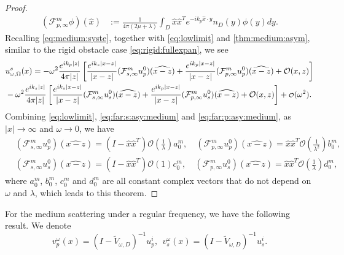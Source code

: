 \documentclass[a4paper,11pt]{article}
\newcommand{\mO}{\mathcal{O}}
\newcommand\smallO{
  \mathchoice
    {{\scriptstyle\mathcal{O}}}%
    {{\scriptstyle\mathcal{O}}}%
    {{\scriptscriptstyle\mathcal{O}}}%
    {\scalebox{.7}{$\scriptscriptstyle\mathcal{O}$}}%
  }
\theoremstyle{remark}
\theoremstyle{definition}
\numberwithin{equation}{section}
\begin{document}
\begin{proof}
\begin{align}
(\mathcal{F}^{m}_{p,\infty}\phi)(\hat{x})& := \frac{1}{4\pi (2\mu + \lambda)}\int_{D} \hat{x}\hat{x}^{T}e^{-ik_p\hat{x}\cdot y}n_{D}(y) \phi(y) dy.  \label{eq:far:p:asy:medium}
\end{align}
Recalling \eqref{eq:medium:syste}, together with \eqref{eq:lowlimit} and \eqref{thm:medium:asym}, similar to the rigid obstacle case \eqref{eq:rigid:fullexpan}, we see
\begin{align}
 &u_{\omega,\Omega}^s(x)  = -\omega^2\frac{e^{ik_p|z|}}{4 \pi |z|} \left[ \frac{e^{ik_s|x-z|}}{|x-z|} (\mathcal{F}^m_{s,\infty}u_{p}^0)(\widehat{x-z}) + \frac{e^{ik_p|x-z|}}{|x-z|} (\mathcal{F}^m_{p,\infty}u_{p}^0)(\widehat{x-z}) + \mO(x,z) \right] \notag \\
 &-\omega^2\frac{e^{ik_s|z|}}{4 \pi |z|} \left[ \frac{e^{ik_s|x-z|}}{|x-z|} (\mathcal{F}^m_{s,\infty}u_{s}^0)(\widehat{x-z}) + \frac{e^{ik_p|x-z|}}{|x-z|} (\mathcal{F}^m_{p,\infty}u_{s}^0)(\widehat{x-z}) +  \mO(x,z)\right] + \smallO(\omega^2).  \label{eq:medium:fullexpan}
\end{align}
Combining \eqref{eq:lowlimit}, \eqref{eq:far:s:asy:medium} and \eqref{eq:far:p:asy:medium}, as $|x| \rightarrow \infty$ and $\omega \rightarrow 0$, we have
\begin{align}
&(\mathcal{F}^m_{s,\infty}u_{p}^0)(\widehat{x-z}) = (I-\hat{x}\hat{x}^{T})\mO(\frac{1}{\lambda})a^m_0 , \quad (\mathcal{F}^m_{p,\infty}u_{p}^0)(\widehat{x-z}) = \hat{x}\hat{x}^{T}\mO(\frac{1}{\lambda^2})b^m_0, \\
&(\mathcal{F}^m_{s,\infty}u_{s}^0)(\widehat{x-z}) = (I-\hat{x}\hat{x}^{T})\mO(1)c^m_0, \quad  (\mathcal{F}^m_{p,\infty}u_{s}^0)(\widehat{x-z}) = \hat{x}\hat{x}^{T} \mO(\frac{1}{\lambda})d^m_0,
\end{align}
where $a^m_0$, $b^m_0$, $c^m_0$ and $d^m_0$ are all constant complex vectors that do not depend on $\omega$ and $\lambda$, which leads to this theorem.
\end{proof}
For the medium scattering under a regular frequency, we have the following result. We denote
\[
 v_{p}^{\omega}(x) = (I- \tilde{V}_{\omega,D})^{-1}u_{p}^{i}, \ \ v_{s}^{\omega}(x) = (I- \tilde{V}_{\omega,D})^{-1}u_{s}^{i}.
\]
\end{document}
